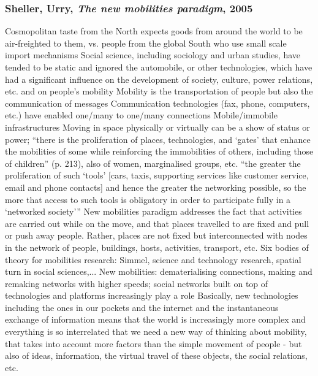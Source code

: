 \documentclass{article}
\begin{document}
\subsubsection{Sheller, Urry, \textit{The new mobilities paradigm}, 2005}

\begin{outline}
	\1 Cosmopolitan taste from the North expects goods from around the world to be air-freighted to them, vs. people from the global South who use small scale import mechanisms
	\1 Social science, including sociology and urban studies, have tended to be static and ignored the automobile, or other technologies, which have had a significant influence on the development of society, culture, power relations, etc. and on people's mobility
	\1 Mobility is the transportation of people but also the communication of messages
		\2 Communication technologies (fax, phone, computers, etc.) have enabled one/many to one/many connections
		\2 Mobile/immobile infrastructures
	\1 Moving in space physically or virtually can be a show of status or power; ``there is the proliferation of places, technologies, and `gates' that enhance the mobilities of some while reinforcing the immobilities of others, including those of children'' (p. 213), also of women, marginalised groups, etc.
	\1 ``the greater the proliferation of such `tools' [cars, taxis, supporting services like customer service, email and phone contacts] and hence the greater the networking possible, so the more that access to such tools is obligatory in order to participate fully in a `networked society'''
	\1 New mobilities paradigm addresses the fact that activities are carried out while on the move, and that places travelled to are fixed and pull or push away people. Rather, places are not fixed but interconnected with nodes in the network of people, buildings, hosts, activities, transport, etc.
	\1 Six bodies of theory for mobilities research:
		\2 Simmel, science and technology research, spatial turn in social sciences,...
	\1 New mobilities: dematerialising connections, making and remaking networks with higher speeds; social networks built on top of technologies and platforms increasingly play a role 
	\1 Basically, new technologies including the ones in our pockets and the internet and the instantaneous exchange of information means that the world is increasingly more complex and everything is so interrelated that we need a new way of thinking about mobility, that takes into account more factors than the simple movement of people - but also of ideas, information, the virtual travel of these objects, the social relations, etc.		
\end{outline}
\end{document}
